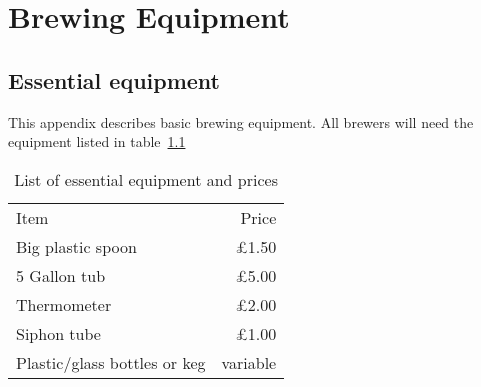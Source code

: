 %
%

\chapter{Brewing Equipment}

\section{Essential equipment}

This appendix describes basic brewing equipment. All brewers will need the
equipment listed in table~\ref{tab:equipment}
\begin{table}
\begin{center}
\begin{tabular}{lr}
    Item & Price \\
    Big plastic spoon & \pounds 1.50 \\
    5 Gallon tub & \pounds 5.00 \\
    Thermometer & \pounds 2.00 \\
    Siphon tube & \pounds 1.00 \\
    Plastic/glass bottles or keg & variable
\end{tabular}
\end{center}
\caption{List of essential equipment and prices}
\label{tab:equipment}
\end{table}
